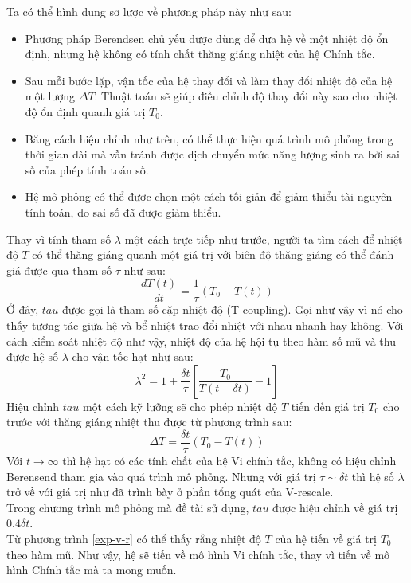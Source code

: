 \documentclass[12pt,a4paper,reqno, oneside]{book}
\begin{document}
			Ta có thể hình dung sơ lược về phương pháp này như sau:
			\begin{itemize}
			\item Phương pháp Berendsen chủ yếu được dùng để đưa hệ về một nhiệt độ ổn định, nhưng hệ không có tính chất thăng giáng nhiệt của hệ Chính tắc.
			\item Sau mỗi bước lặp, vận tốc của hệ thay đổi và làm thay đổi nhiệt độ của hệ một lượng $\Delta T$. Thuật toán sẽ giúp điều chỉnh độ thay đổi này sao cho nhiệt độ ổn định quanh giá trị $T_{0}$.
			\item Băng cách hiệu chỉnh như trên, có thể thực hiện quá trình mô phỏng trong thời gian dài mà vẫn tránh được dịch chuyển mức năng lượng sinh ra bởi sai số của phép tính toán số.
			\item Hệ mô phỏng có thể được chọn một cách tối giản để giảm thiểu tài nguyên tính toán, do sai số đã được giảm thiểu.
			\end{itemize}
			Thay vì tính tham số $\lambda$ một cách trực tiếp như trước, người ta tìm cách để nhiệt độ $T$ có thể thăng giáng quanh một giá trị với biên độ thăng giáng có thể đánh giá được qua tham số $\tau$ như sau:
			\begin{equation}
			\dfrac{dT\left(t\right)}{dt} = \dfrac{1}{\tau}\left(T_{0}-T\left(t\right)\right)
			\label{exp-v-r}
			\end{equation}
			Ở đây, $tau$ được gọi là tham số cặp nhiệt độ (T-coupling). Gọi như vậy vì nó cho thấy tương tác giữa hệ và bể nhiệt trao đổi nhiệt với nhau nhanh hay không. Với cách kiểm soát nhiệt độ như vậy, nhiệt độ của hệ hội tụ theo hàm số mũ và thu được hệ số $\lambda$ cho vận tốc hạt như sau:
			\begin{equation}
			\lambda^{2} = 1 + \dfrac{\delta t}{\tau}\left[\dfrac{T_{0}}{T\left(t-\delta t\right)}-1\right]
			\end{equation}
			Hiệu chỉnh $tau$ một cách kỹ lưỡng sẽ cho phép nhiệt độ $T$ tiến đến giá trị $T_{0}$ cho trước với thăng giáng nhiệt thu được từ phương trình sau:
			\begin{equation}
			\Delta T = \dfrac{\delta t}{\tau}\left(T_{0}-T\left(t\right)\right)
			\end{equation}
			Với $t\rightarrow \infty$ thì hệ hạt có các tính chất của hệ Vi chính tắc, không có hiệu chỉnh Berensend tham gia vào quá trình mô phỏng. Nhưng với giá trị $\tau \sim \delta t$ thì hệ số $\lambda$ trở về với giá trị như đã trình bày ở phần tổng quát của V-rescale.\\
			Trong chương trình mô phỏng mà đề tài sử dụng, $tau$ được hiệu chỉnh về giá trị $0.4\delta t$.\\
			Từ phương trình \eqref{exp-v-r} có thể thấy rằng nhiệt độ $T$ của hệ tiến về giá trị $T_{0}$ theo hàm mũ. Như vậy, hệ sẽ tiến về mô hình Vi chính tắc, thay vì tiến về mô hình Chính tắc mà ta mong muốn.
\end{document}
